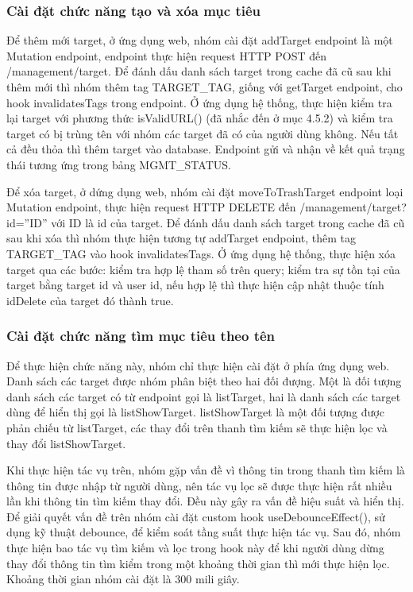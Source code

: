\subsubsection{Cài đặt chức năng tạo và xóa mục tiêu}

\tab Để thêm mới target, ở ứng dụng web, nhóm cài đặt addTarget endpoint là một Mutation endpoint, endpoint thực hiện request HTTP POST đến /management/target. Để đánh dấu danh sách target trong cache đã cũ sau khi thêm mới thì nhóm thêm tag TARGET\_TAG, giống với getTarget endpoint, cho hook invalidatesTags trong endpoint. Ở ứng dụng hệ thống, thực hiện kiểm tra lại target với phương thức isValidURL() (đã nhắc đến ở mục 4.5.2) và kiểm tra target có bị trùng tên với nhóm các target đã có của người dùng không. Nếu tất cả đều thỏa thì thêm target vào database. Endpoint gửi và nhận về kết quả trạng thái tương ứng trong bảng MGMT\_STATUS.

Để xóa target, ở dứng dụng web, nhóm cài đặt moveToTrashTarget endpoint loại Mutation endpoint, thực hiện request HTTP DELETE đến /management/target?id=”ID” với ID là id của target. Để đánh dấu danh sách target trong cache đã cũ sau khi xóa thì nhóm thực hiện tương tự addTarget endpoint, thêm tag TARGET\_TAG vào hook invalidatesTags. Ở ứng dụng hệ thống, thực hiện xóa target qua các bước: kiểm tra hợp lệ tham số trên query; kiểm tra sự tồn tại của target bằng target id và user id, nếu hợp lệ thì thực hiện cập nhật thuộc tính idDelete của target đó thành true.

\subsubsection{Cài đặt chức năng tìm mục tiêu theo tên}

\tab Để thực hiện chức năng này, nhóm chỉ thực hiện cài đặt ở phía ứng dụng web. Danh sách các target được nhóm phân biệt theo hai đối đượng. Một là đối tượng danh sách các target có từ endpoint gọi là listTarget, hai là danh sách các target dùng để hiển thị gọi là listShowTarget. listShowTarget là một đối tượng được phản chiếu từ listTarget, các thay đổi trên thanh tìm kiếm sẽ thực hiện lọc và thay đổi listShowTarget.

Khi thực hiện tác vụ trên, nhóm gặp vấn đề vì thông tin trong thanh tìm kiếm là thông tin được nhập từ người dùng, nên tác vụ lọc sẽ được thực hiện rất nhiều lần khi thông tin tìm kiếm thay đổi. Đều này gây ra vấn đề hiệu suất và hiển thị. Để giải quyết vấn đề trên nhóm cài đặt custom hook useDebounceEffect(), sử dụng kỹ thuật debounce, để kiểm soát tầng suất thực hiện tác vụ. Sau đó, nhóm thực hiện bao tác vụ tìm kiếm và lọc trong hook này để khi người dùng dừng thay đổi thông tin tìm kiểm trong một khoảng thời gian thì mới thực hiện lọc. Khoảng thời gian nhóm cài đặt là 300 mili giây.

